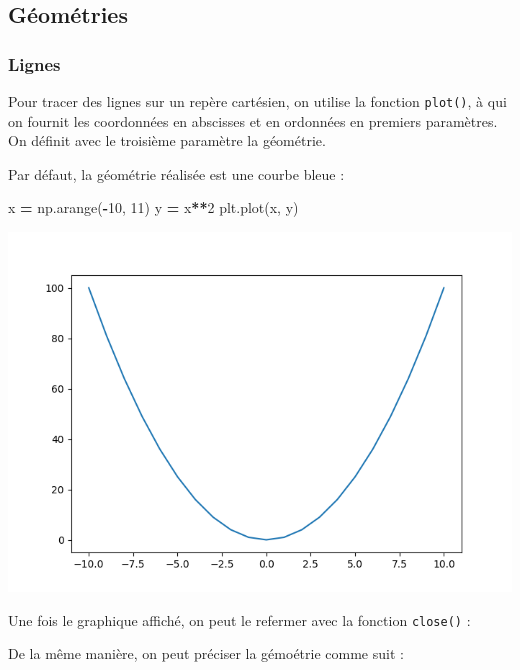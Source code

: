 \documentclass[12pt,]{book}
\newenvironment{Shaded}{\begin{snugshade}}{\end{snugshade}}
\newcommand{\DecValTok}[1]{\textcolor[rgb]{0.00,0.00,0.81}{#1}}
\newcommand{\OperatorTok}[1]{\textcolor[rgb]{0.81,0.36,0.00}{\textbf{#1}}}
\newcommand{\NormalTok}[1]{#1}
\numberwithin{equation}{section}
\numberwithin{countremarque}{section}
\begin{document}
\subsection{Géométries}\label{geometries}

\subsubsection{Lignes}\label{matplotlib-plot}

Pour tracer des lignes sur un repère cartésien, on utilise la fonction
\texttt{plot()}, à qui on fournit les coordonnées en abscisses et en
ordonnées en premiers paramètres. On définit avec le troisième paramètre
la géométrie.

Par défaut, la géométrie réalisée est une courbe bleue :

\begin{Shaded}
\begin{Highlighting}[]
\NormalTok{x }\OperatorTok{=}\NormalTok{ np.arange(}\OperatorTok{-}\DecValTok{10}\NormalTok{, }\DecValTok{11}\NormalTok{)}
\NormalTok{y }\OperatorTok{=}\NormalTok{ x}\OperatorTok{**}\DecValTok{2}
\NormalTok{plt.plot(x, y)}
\end{Highlighting}
\end{Shaded}

\begin{center}\includegraphics[width=9.03in]{figs/pyplot/lignes_1} \end{center}

Une fois le graphique affiché, on peut le refermer avec la fonction
\texttt{close()} :

De la même manière, on peut préciser la gémoétrie comme suit :
\end{document}
